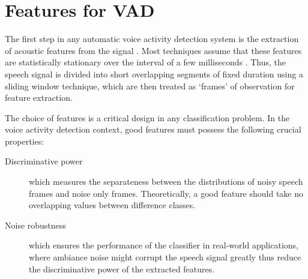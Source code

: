 \section{Features for VAD}
The first step in any automatic voice activity detection system is the extraction of acoustic features from the signal \cite{ishizuka2010noise,cho2011enhanced}.
Most techniques assume that these features are statistically stationary over the interval of a few milliseconds \cite{ishizuka2010noise}.
Thus, the speech signal is divided into short overlapping segments of fixed duration using a sliding window technique, which are then treated as `frames' of observation for feature extraction.



The choice of features is a critical design in any classification problem.
In the voice activity detection context, good features must possess the following crucial properties:

\begin{description}
    \item[Discriminative power] which measures the separateness between the distributions of noisy speech frames and noise only frames. Theoretically, a good feature should take no overlapping values between difference classes.
    \item[Noise robustness] which ensures the performance of the classifier in real-world applications, where ambiance noise might corrupt the speech signal greatly thus reduce the discriminative power of the extracted features.
\end{description}

